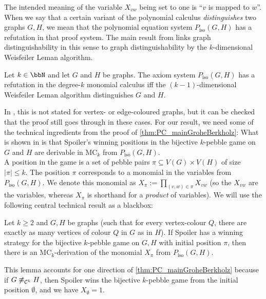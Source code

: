 \documentclass[a4paper,UKenglish,cleveref, autoref, thm-restate]{lipics-v2021}
\newcommand{\MC}{\textrm{MC}}
\newcommand{\Cc}{{\cal C}}
\newcommand{\Piso}{P_{\text{iso}}}
\begin{document}
	The intended meaning of the variable $X_{vw}$ being set to one is ``$v$ is mapped to $w$''. 
	When we say that a certain variant of the polynomial calculus \emph{distinguishes} two graphs $G,H$, we mean that the polynomial equation system $\Piso(G,H)$ has a refutation in that proof system.
	The main result from \cite{berkholz} links graph distinguishability in this sense to graph distinguishability by the $k$-dimensional Weisfeiler Leman algorithm. 
	\begin{theorem}
		\label{thm:PC_mainGroheBerkholz}
		Let $k \in \bbN$ and let $G$ and $H$ be graphs.
		The axiom system $\Piso(G,H)$ has a refutation in the degree-$k$ monomial calculus iff the $(k-1)$-dimensional Weisfeiler Leman algorithm distinguishes $G$ and $H$.
	\end{theorem}
	In \cite{berkholz}, this is not stated for vertex- or edge-coloured graphs, but it can be checked that the proof still goes through in these cases.
	For our result, we need some of the technical ingredients from the proof of \autoref{thm:PC_mainGroheBerkholz}: What is shown in \cite{berkholz} is that Spoiler's winning positions in the bijective $k$-pebble game on $G$ and $H$ are derivable in $\MC_k$ from $\Piso(G,H)$.\\
	A position in the game is a set of pebble pairs $\pi \subseteq V(G) \times V(H)$ of size $|\pi| \leq k$. The position $\pi$ corresponds to a monomial in the variables from $\Piso(G,H)$. We denote this monomial as $X_\pi := \prod_{(v,w) \in \pi} X_{vw}$ (so the $X_{vw}$ are the variables, whereas $X_\pi$ is shorthand for a \emph{product} of variables). We will use the following central technical result as a blackbox:
	\begin{lemma}
		\label{lem:PC_groheberkholzlemma}
		Let $k \geq 2$ and $G,H$ be graphs (such that for every vertex-colour $Q$, there are exactly as many vertices of colour $Q$ in $G$ as in $H$). If Spoiler has a winning strategy for the bijective $k$-pebble game on $G,H$ with initial position $\pi$, then there is an $\MC_k$-derivation of the monomial $X_{\pi}$ from $\Piso(G,H)$.
	\end{lemma}
	This lemma accounts for one direction of \autoref{thm:PC_mainGroheBerkholz} because if $G \not\equiv_{\Cc^{k}} H$, then Spoiler wins the bijective $k$-pebble game from the initial position $\emptyset$, and we have $X_\emptyset = 1$. 
	
	
	
\end{document}
